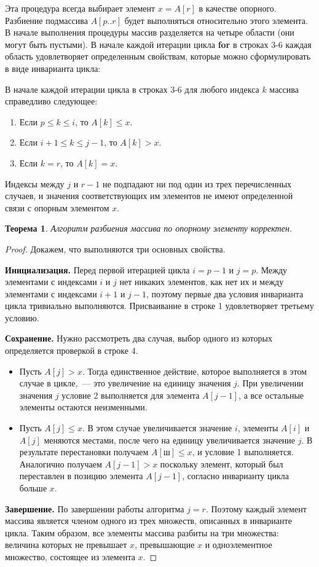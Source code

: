 \documentclass[a4paper,12pt]{article}
\newtheorem*{theorem}{Теорема}
\begin{document}
Эта процедура всегда выбирает элемент \(x = A[r]\) в качестве опорного. Разбиение подмассива \(A[p..r]\) будет выполняться относительно этого элемента. В начале выполнения процедуры массив разделяется на четыре области (они могут быть пустыми). В начале каждой итерации цикла \textbf{for} в строках 3-6 каждая область удовлетворяет определенным свойствам, которые можно сформулировать в виде инварианта цикла:

В начале каждой итерации цикла в строках 3-6 для любого индекса \(k\) массива справедливо следующее:
\begin{enumerate}
	\item Если \(p \leqslant k \leqslant i\), то \(A[k] \leqslant x\).
	\item Если \(i + 1 \leqslant k \leqslant j - 1\), то \(A[k] > x\).
	\item Если \(k = r\), то \(A[k] = x\).
\end{enumerate}

Индексы между \(j\) и \(r - 1\) не подпадают ни под один из трех перечисленных случаев, и значения соответствующих им элементов не имеют определенной связи с опорным элементом \(x\).

\begin{theorem}
	Алгоритм разбиения массива по опорному элементу корректен.
\end{theorem}
\begin{proof}
	Докажем, что выполняются три основных свойства.
	
	\textbf{Инициализация.} Перед первой итерацией цикла \(i = p - 1\) и \(j = p\). Между элементами с индексами \(i\) и \(j\) нет никаких элементов, как нет их и между элементами с индексами \(i + 1\) и \(j - 1\), поэтому первые два условия 
	инварианта цикла тривиально выполняются. Присваивание в строке 1 удовлетворяет третьему условию.
	
	\textbf{Сохранение.} Нужно рассмотреть два случая, выбор 
	одного из которых определяется проверкой в строке 4. 
	\begin{itemize}
		\item Пусть \(A[j] > x\). Тогда единственное действие, которое выполняется в этом случае в цикле,~--- это увеличение на единицу значения \(j\). При 
		увеличении значения \(j\) условие 2 выполняется для элемента  \(A[j - 1]\), а все остальные элементы остаются неизменными.
		\item Пусть \(A[j] \leqslant x\). В этом случае увеличивается значение \(i\), элементы \(A[i]\) и \(A[j]\) меняются местами, после чего на единицу увеличивается значение \(j\). В результате перестановки получаем \(A[ ш] \leqslant x\), и условие 1 выполняется. Аналогично
		получаем \(A[j - 1] > x\) поскольку элемент, который был переставлен в позицию элемента \(A[j - 1]\), согласно инварианту цикла больше \(x\).
	\end{itemize}
	
	\textbf{Завершение.} По завершении работы алгоритма \(j = r\). Поэтому каждый элемент массива является членом одного из трех множеств, описанных в инварианте цикла. Таким образом, все элементы массива разбиты на три множества: величина которых не превышает \(x\), превышающие \(x\) и одноэлементное множество, состоящее из элемента \(x\).
\end{proof}
\end{document}
